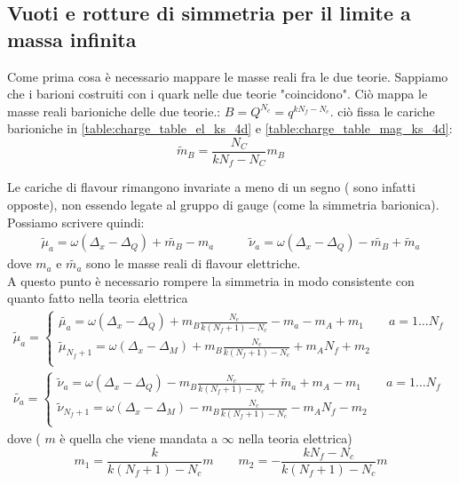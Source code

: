 \documentclass[a4paper,12pt]{article}
\begin{document}
\subsection{Vuoti e rotture di simmetria per il limite a massa infinita}
Come prima cosa è necessario mappare le masse reali fra le due teorie. Sappiamo che i barioni costruiti con i quark nelle due teorie "coincidono". Ciò mappa le masse reali barioniche delle due teorie.: $ B = Q^{N_c} = q^{k N_f - N_c} $. ciò fissa  le cariche barioniche in \ref{table:charge_table_el_ks_4d} e \ref{table:charge_table_mag_ks_4d}:
$$
		\tilde{m}_B = \frac{ N_C}{ kN_f - N_C } m_B
$$

Le cariche di flavour rimangono invariate a meno di un segno ( sono infatti opposte), non essendo legate al gruppo di gauge (come la simmetria barionica).\\
Possiamo scrivere quindi:
\begin{align*}
 \tilde \mu_a = \omega ( \Delta_x - \Delta_Q ) + \tilde{m_B} - m_a    \qquad &  \tilde \nu_a = \omega ( \Delta_x - \Delta_Q ) - \tilde{m_B} + \tilde m_a  
\end{align*}
dove $ m_a$ e $\tilde{m_a}$ sono le masse reali di flavour elettriche.\\
A questo punto è necessario rompere la simmetria in modo consistente con quanto fatto nella teoria elettrica
\begin{align*}
	 \tilde \mu_a =
	 \begin{cases}
	  \tilde{ \mu_a} =  \omega ( \Delta_x - \Delta_Q ) + m_B \frac{N_c}{k(N_f +1) - N_c} - m_a  - m_A + m_1  \qquad a = 1 \dots N_f \\
	  \tilde \mu_{N_f+1} =  \omega ( \Delta_x - \Delta_M ) + m_B \frac{N_c}{k(N_f +1) - N_c} +  m_A N_f + m_2    \\
	 \end{cases} 
	 \\
\tilde{ \nu_a} = 	
	\begin{cases}
	\tilde \nu_a = \omega ( \Delta_x - \Delta_Q ) - m_B \frac{N_c}{k(N_f +1) - N_c}  + \tilde m_a  + m_A - m_1 \qquad a = 1 \dots N_f\\
	 \tilde \nu_{N_f+1} = \omega ( \Delta_x - \Delta_M ) - m_B \frac{N_c}{k(N_f +1) - N_c}  -  m_A N_f- m_2 \\
	\end{cases}	 
\end{align*}
dove ( $m$ è quella che viene mandata a $\infty$ nella teoria elettrica)
$$
 m_1  = \frac{k}{k(N_f+1) - N_c} m \qquad m_2 = - \frac{k N_f - N_c}{k(N_f+1)-N_c} m
$$
\end{document}

